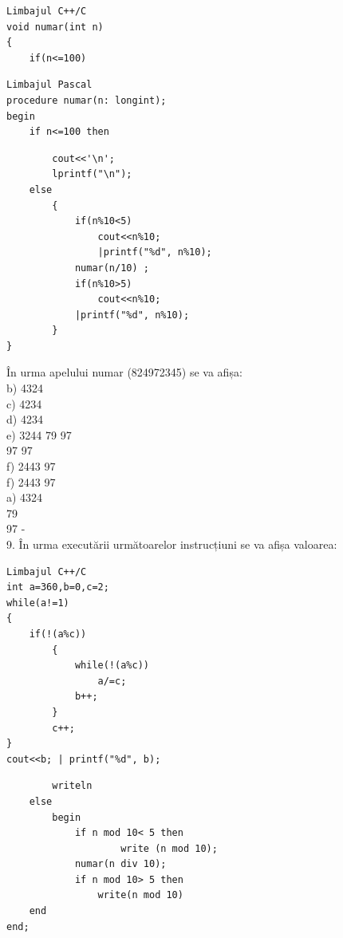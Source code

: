 \documentclass[10pt]{article}
\begin{document}
\begin{verbatim}
Limbajul C++/C
void numar(int n)
{
    if(n<=100)
\end{verbatim}

\begin{verbatim}
Limbajul Pascal
procedure numar(n: longint);
begin
    if n<=100 then
\end{verbatim}

\begin{verbatim}
        cout<<'\n';
        lprintf("\n");
    else
        {
            if(n%10<5)
                cout<<n%10;
                |printf("%d", n%10);
            numar(n/10) ;
            if(n%10>5)
                cout<<n%10;
            |printf("%d", n%10);
        }
}
\end{verbatim}

În urma apelului numar (824972345) se va afișa:\\
b) 4324\\
c) 4234\\
d) 4234\\
e) 3244 79 97\\
97 97\\
f) 2443 97\\
f) 2443 97\\
a) 4324\\
79\\
97 -\\
9. În urma executării următoarelor instrucțiuni se va afișa valoarea:

\begin{verbatim}
Limbajul C++/C
int a=360,b=0,c=2;
while(a!=1)
{
    if(!(a%c))
        {
            while(!(a%c))
                a/=c;
            b++;
        }
        c++;
}
cout<<b; | printf("%d", b);
\end{verbatim}

\begin{verbatim}
        writeln
    else
        begin
            if n mod 10< 5 then
                    write (n mod 10);
            numar(n div 10);
            if n mod 10> 5 then
                write(n mod 10)
    end
end;
\end{verbatim}
\end{document}
